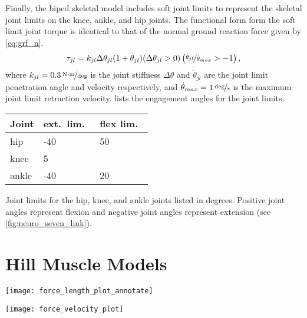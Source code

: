 Finally, the biped skeletal model includes soft joint limits to represent
the skeletal joint limits on the knee, ankle, and hip joints. The functional
form form the soft limit joint torque is identical to that of the normal ground
reaction force given by \cref{eq:grf_n}.
\begin{align}
    \tau_{jl} = k_{jl} \Delta \theta_{jl} (1 + \dot \theta_{jl}) (\Delta
    \theta_{jl}  > 0) \left(\nicefrac{\dot \theta_{jl}}{\dot \theta_{max}} > -1
    \right), 
    \label{eq:grf_n}
\end{align}
where $k_{jl} = \unitfrac[0.3]{N \cdot m}{deg}$ is the joint stiffness $\Delta
\theta$ and $\dot \theta_{jl}$ are the joint limit penetration angle and
velocity respectively, and $\dot \theta_{max} = \unitfrac[1]{deg}{s}$ is the
maximum joint limit retraction velocity.  lists the
engagement angles for the joint limits.

\begin{margintable}
  \centering
      \begin{tabular}{lll}
        \toprule
        Joint & ext.\ lim.\ & flex lim.\ \\
        \midrule
        hip   & -40 & 50 \\
        knee  & 5 &      \\
        ankle & -40 & 20 \\
        \bottomrule
      \end{tabular}
  \caption{Joint limits for the hip, knee, and ankle joints listed in degrees.
  Positive joint angles represent flexion and negative joint angles represent
  extension (see \cref{fig:neuro_seven_link}).}\label{tab:joint_lim}
\end{margintable}

\section{Hill Muscle Models}\label{sec:neuro_hill_muscle}

\begin{marginfigure}
    \centering
    \texttt{[image: force\_length\_plot\_annotate]}
    \caption{}
    \label{fig:force_length_ce}
\end{marginfigure}

\begin{marginfigure}
    \centering
    \texttt{[image: force\_velocity\_plot]}
    \caption{}
    \label{fig:force_velocity_ce}
\end{marginfigure}

